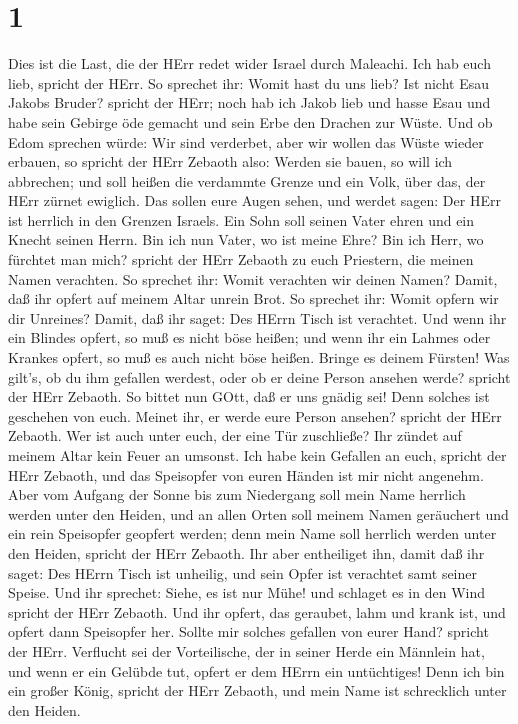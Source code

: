 \hypertarget{section}{%
\section{1}\label{section}}

 Dies ist die Last, die der HErr redet wider Israel durch
Maleachi.  Ich hab euch lieb, spricht der HErr. So sprechet
ihr: Womit hast du uns lieb? Ist nicht Esau Jakobs Bruder? spricht der
HErr; noch hab ich Jakob lieb  und hasse Esau und habe sein
Gebirge öde gemacht und sein Erbe den Drachen zur Wüste. 
Und ob Edom sprechen würde: Wir sind verderbet, aber wir wollen das
Wüste wieder erbauen, so spricht der HErr Zebaoth also: Werden sie
bauen, so will ich abbrechen; und soll heißen die verdammte Grenze und
ein Volk, über das, der HErr zürnet ewiglich.  Das sollen
eure Augen sehen, und werdet sagen: Der HErr ist herrlich in den Grenzen
Israels.  Ein Sohn soll seinen Vater ehren und ein Knecht
seinen Herrn. Bin ich nun Vater, wo ist meine Ehre? Bin ich Herr, wo
fürchtet man mich? spricht der HErr Zebaoth zu euch Priestern, die
meinen Namen verachten. So sprechet ihr: Womit verachten wir deinen
Namen?  Damit, daß ihr opfert auf meinem Altar unrein Brot.
So sprechet ihr: Womit opfern wir dir Unreines? Damit, daß ihr saget:
Des HErrn Tisch ist verachtet.  Und wenn ihr ein Blindes
opfert, so muß es nicht böse heißen; und wenn ihr ein Lahmes oder
Krankes opfert, so muß es auch nicht böse heißen. Bringe es deinem
Fürsten! Was gilt's, ob du ihm gefallen werdest, oder ob er deine Person
ansehen werde? spricht der HErr Zebaoth.  So bittet nun
GOtt, daß er uns gnädig sei! Denn solches ist geschehen von euch. Meinet
ihr, er werde eure Person ansehen? spricht der HErr Zebaoth.
 Wer ist auch unter euch, der eine Tür zuschließe? Ihr
zündet auf meinem Altar kein Feuer an umsonst. Ich habe kein Gefallen an
euch, spricht der HErr Zebaoth, und das Speisopfer von euren Händen ist
mir nicht angenehm.  Aber vom Aufgang der Sonne bis zum
Niedergang soll mein Name herrlich werden unter den Heiden, und an allen
Orten soll meinem Namen geräuchert und ein rein Speisopfer geopfert
werden; denn mein Name soll herrlich werden unter den Heiden, spricht
der HErr Zebaoth.  Ihr aber entheiliget ihn, damit daß ihr
saget: Des HErrn Tisch ist unheilig, und sein Opfer ist verachtet samt
seiner Speise.  Und ihr sprechet: Siehe, es ist nur Mühe!
und schlaget es in den Wind spricht der HErr Zebaoth. Und ihr opfert,
das geraubet, lahm und krank ist, und opfert dann Speisopfer her. Sollte
mir solches gefallen von eurer Hand? spricht der HErr. 
Verflucht sei der Vorteilische, der in seiner Herde ein Männlein hat,
und wenn er ein Gelübde tut, opfert er dem HErrn ein untüchtiges! Denn
ich bin ein großer König, spricht der HErr Zebaoth, und mein Name ist
schrecklich unter den Heiden.

